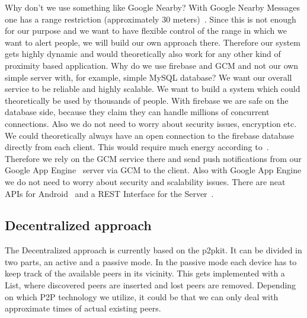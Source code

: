 \documentclass{report}
\begin{document}
Why don't we use something like Google Nearby? 
With Google Nearby Messages one has a range restriction (approximately 30 meters)~\cite{nearby}. Since this is not enough for our purpose and we want to have flexible control of the range in which we want to alert people, we will build our own approach there. Therefore our system gets highly dynamic and would theoretically also work for any other kind of proximity based application.
Why do we use firebase and GCM and not our own simple server with, for example, simple MySQL database? We want our overall service to be reliable and highly scalable. We want to build a system which could theoretically be used by thousands of people. With firebase we are safe on the database side, because they claim they can handle millions of concurrent connections. Also we do not need to worry about security issues, encryption etc. We could theoretically always have an open connection to the firebase database directly from each client. This would require much energy according to~\cite{stackoverflow}. Therefore we rely on the GCM service there and send push notifications from our Google App Engine~\cite{google_app_engine} server via GCM to the client. Also with Google App Engine we do not need to worry about security and scalability issues. There are neat APIs for Android~\cite{firebase_java} and a REST Interface for the Server~\cite{firebase_rest}.

\subsection{Decentralized approach}

The Decentralized approach is currently based on the p2pkit. It can be divided in two parts, an active and a passive mode. In the passive mode each device has to keep track of the available peers in its vicinity. This gets implemented with a List, where discovered peers are inserted and lost peers are removed. Depending on which P2P technology we utilize, it could be that we can only deal with approximate times of actual existing peers.
\end{document}
